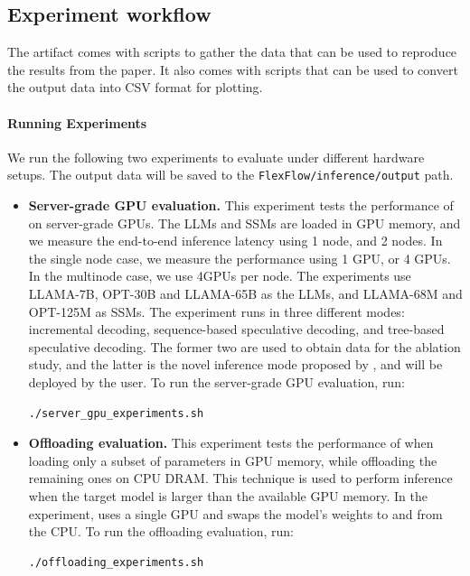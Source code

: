 \subsection{Experiment workflow}
The artifact comes with scripts to gather the data that can be used to reproduce the results from the paper. It also comes with scripts that can be used to convert the output data into CSV format for plotting. 

\paragraph{Running Experiments}
We run the following two experiments to evaluate \sys under different hardware setups. The output data will be saved to the \texttt{FlexFlow/inference/output} path. 

\begin{itemize}
    \item \textbf{Server-grade GPU evaluation.} This experiment tests the performance of \sys on server-grade GPUs. The LLMs and SSMs are loaded in GPU memory, and we measure the end-to-end inference latency using 1 node, and 2 nodes. In the single node case, we measure the performance using 1 GPU, or 4 GPUs. In the multinode case, we use 4GPUs per node. The experiments use LLAMA-7B, OPT-30B and LLAMA-65B as the LLMs, and LLAMA-68M and OPT-125M as SSMs. The experiment runs \sys in three different modes: incremental decoding, sequence-based speculative decoding, and tree-based speculative decoding. The former two are used to obtain data for the ablation study, and the latter is the novel inference mode proposed by \sys, and will be deployed by the user. To run the server-grade GPU evaluation, run:
\begin{lstlisting}[language=sh]
./server_gpu_experiments.sh
\end{lstlisting}
\item \textbf{Offloading evaluation.} This experiment tests the performance of \sys when loading only a subset of parameters in GPU memory, while offloading the remaining ones on CPU DRAM. This technique is used to perform inference when the target model is larger than the available GPU memory. In the experiment, \sys uses a single GPU and swaps the model's weights to and from the CPU. To run the offloading evaluation, run: 
\begin{lstlisting}[language=sh]
./offloading_experiments.sh
\end{lstlisting}
\end{itemize}

